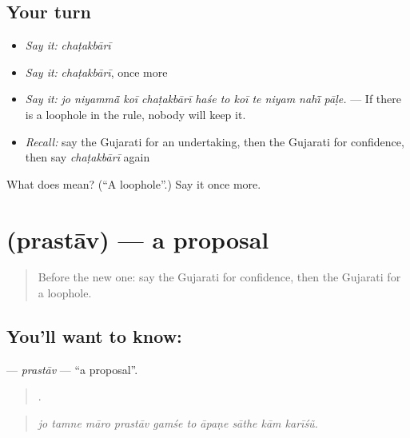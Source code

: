 \subsection*{Your turn}
\begin{itemize}
\raggedright
  \item \emph{Say it:} \emph{chaṭakbārī}
  \item \emph{Say it:} \emph{chaṭakbārī}, once more
  \item \emph{Say it:} \emph{jo niyammā̃ koī chaṭakbārī haśe to koī te niyam nahī̃ pāḷe.} — If there is a loophole in the rule, nobody will keep it.
  \item \emph{Recall:} say the Gujarati for an undertaking, then the Gujarati for confidence, then say \emph{chaṭakbārī} again
\end{itemize}

\begin{tcolorbox}[breakable,colback=teal!4,colframe=teal!35!black,title={Before you move on}]
What does  mean? (\textquotedblleft{}A loophole\textquotedblright{}.) Say it once more.
\end{tcolorbox}
\section[\texorpdfstring{\gu{પ્રસ્તાવ} (prastāv)}{પ્રસ્તાવ (prastāv)}]{ (prastāv) — a proposal}

\label{lesson:GU-C541-prastav}



\begin{quote}
Before the new one: say the Gujarati for confidence, then the Gujarati for a loophole.
\end{quote}

\subsection*{You'll want to know: }
\textbf{} — \emph{prastāv} — \textquotedblleft{}a proposal\textquotedblright{}.

\begin{quote}
         .
\end{quote}

\begin{quote}
\emph{jo tamne māro prastāv gamśe to āpaṇe sāthe kām karīśũ.}
\end{quote}

